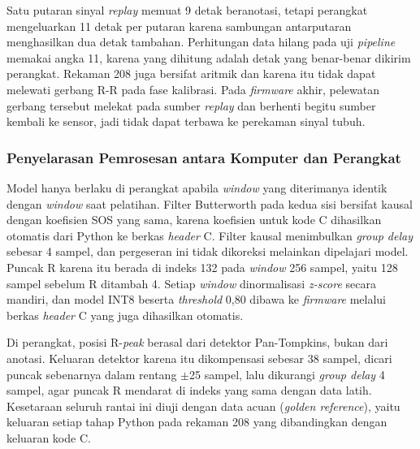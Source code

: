 Satu putaran sinyal \textit{replay} memuat 9 detak beranotasi, tetapi perangkat mengeluarkan 11 detak per putaran karena sambungan antarputaran menghasilkan dua detak tambahan. Perhitungan data hilang pada uji \textit{pipeline} memakai angka 11, karena yang dihitung adalah detak yang benar-benar dikirim perangkat. Rekaman 208 juga bersifat aritmik dan karena itu tidak dapat melewati gerbang R-R pada fase kalibrasi. Pada \textit{firmware} akhir, pelewatan gerbang tersebut melekat pada sumber \textit{replay} dan berhenti begitu sumber kembali ke sensor, jadi tidak dapat terbawa ke perekaman sinyal tubuh.

\subsubsection{Penyelarasan Pemrosesan antara Komputer dan Perangkat}

Model hanya berlaku di perangkat apabila \textit{window} yang diterimanya identik dengan \textit{window} saat pelatihan. Filter Butterworth pada kedua sisi bersifat kausal dengan koefisien SOS yang sama, karena koefisien untuk kode C dihasilkan otomatis dari Python ke berkas \textit{header} C. Filter kausal menimbulkan \textit{group delay} sebesar 4 sampel, dan pergeseran ini tidak dikoreksi melainkan dipelajari model. Puncak R karena itu berada di indeks 132 pada \textit{window} 256 sampel, yaitu 128 sampel sebelum R ditambah 4. Setiap \textit{window} dinormalisasi \textit{z-score} secara mandiri, dan model INT8 beserta \textit{threshold} 0,80 dibawa ke \textit{firmware} melalui berkas \textit{header} C yang juga dihasilkan otomatis.

Di perangkat, posisi R-\textit{peak} berasal dari detektor Pan-Tompkins, bukan dari anotasi. Keluaran detektor karena itu dikompensasi sebesar 38 sampel, dicari puncak sebenarnya dalam rentang $\pm$25 sampel, lalu dikurangi \textit{group delay} 4 sampel, agar puncak R mendarat di indeks yang sama dengan data latih. Kesetaraan seluruh rantai ini diuji dengan data acuan (\textit{golden reference}), yaitu keluaran setiap tahap Python pada rekaman 208 yang dibandingkan dengan keluaran kode C.


